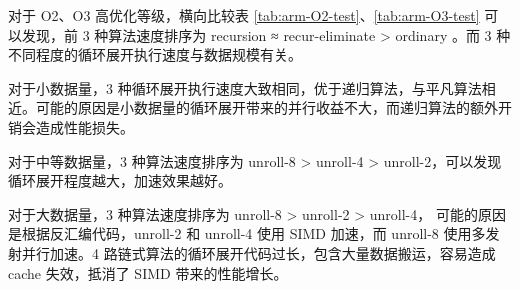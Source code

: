 \documentclass[a4paper]{article}
\begin{document}
对于 O2、O3 高优化等级，横向比较表 \ref{tab:arm-O2-test}、\ref{tab:arm-O3-test} 可以发现，前 3 种算法速度排序为
recursion ≈ recur-eliminate > ordinary 。而 3 种不同程度的循环展开执行速度与数据规模有关。

对于小数据量，3 种循环展开执行速度大致相同，优于递归算法，与平凡算法相近。可能的原因是小数据量的循环展开带来的并行收益不大，而递归算法的额外开销会造成性能损失。

对于中等数据量，3 种算法速度排序为 unroll-8 > unroll-4 > unroll-2，可以发现循环展开程度越大，加速效果越好。

对于大数据量，3 种算法速度排序为 unroll-8 > unroll-2 > unroll-4，
可能的原因是根据反汇编代码，unroll-2 和 unroll-4 使用 SIMD 加速，而 unroll-8 使用多发射并行加速。4 路链式算法的循环展开代码过长，包含大量数据搬运，容易造成 cache 失效，抵消了 SIMD 带来的性能增长。
\end{document}
